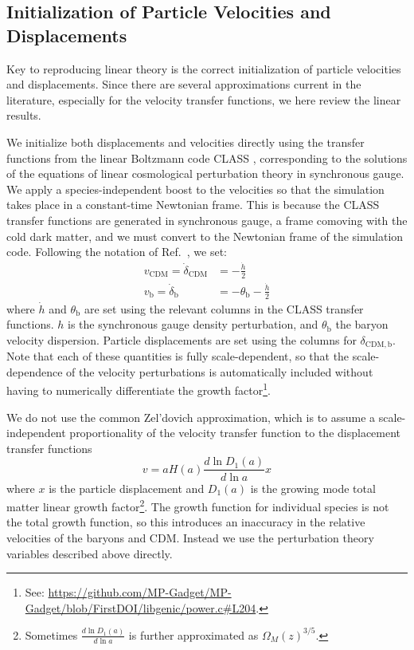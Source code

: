 \documentclass[a4paper,11pt]{article}
\begin{document}
\subsection{Initialization of Particle Velocities and Displacements}
\label{sec:particles}

Key to reproducing linear theory is the correct initialization of particle velocities and displacements. Since there are several approximations current in the literature, especially for the velocity transfer functions, we here review the linear results.

We initialize both displacements and velocities directly using the transfer functions from the linear Boltzmann code CLASS \cite{CLASS}, corresponding to the solutions of the equations of linear cosmological perturbation theory in synchronous gauge. We apply a species-independent boost to the velocities so that the simulation takes place in a constant-time Newtonian frame. This is because the CLASS transfer functions are generated in synchronous gauge, a frame comoving with the cold dark matter, and we must convert to the Newtonian frame of the simulation code. Following the notation of Ref.~\cite{Ma:1995}, we set:
\begin{align}
 v_\mathrm{CDM} = \dot{\delta}_\mathrm{CDM}  &= - \frac{\dot{h}}{2} \\
 v_\mathrm{b} = \dot{\delta}_\mathrm{b}  &= - \theta_\mathrm{b} - \frac{\dot{h}}{2}
\end{align}
where $\dot{h}$ and $\theta_\mathrm{b}$ are set using the relevant columns in the CLASS transfer functions. $h$ is the synchronous gauge density perturbation, and $\theta_\mathrm{b}$ the baryon velocity dispersion.
Particle displacements are set using the columns for $\delta_\mathrm{CDM, b}$. Note that each of these quantities is fully scale-dependent, so that the scale-dependence of the velocity perturbations is automatically included without having to numerically differentiate the growth factor\footnote{See: \protect\url{https://github.com/MP-Gadget/MP-Gadget/blob/FirstDOI/libgenic/power.c\#L204}.}.

We do not use the common Zel'dovich approximation, which is to assume a scale-independent proportionality of the velocity transfer function to the displacement transfer functions
\begin{equation*}
 v = a H(a) \frac{d \ln D_1(a)}{d \ln a} x
\end{equation*}
where $x$ is the particle displacement and $D_1(a)$ is the growing mode total matter linear growth factor\footnote{Sometimes $\frac{d \ln D_1(a)}{d \ln a}$ is further approximated as $\Omega_M(z)^{3/5}$.}. The growth function for individual species is not the total growth function, so this introduces an inaccuracy in the relative velocities of the baryons and CDM. Instead we use the perturbation theory variables described above directly.
\end{document}

